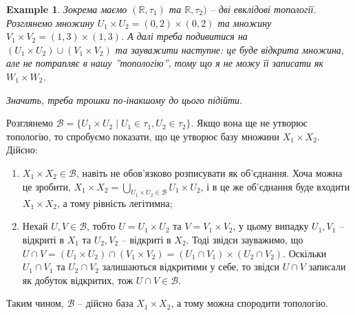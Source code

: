 \documentclass[a4paper, 10pt]{article}
\theoremstyle{theoremdd}
\newtheorem{example}[theorem]{Example}
\begin{document}
\begin{example}
Зокрема маємо $(\mathbb{R},\tau_1)$ та $\mathbb{R},\tau_2)$ -- дві евклідові топології. Розглянемо множину $U_1 \times U_2 = (0,2) \times (0,2)$ та множину $V_1 \times V_2 = (1,3) \times (1,3)$. А далі треба подивитися на $(U_1 \times U_2) \cup (V_1 \times V_2)$ та зауважити наступне: це буде відкрита множина, але не потрапляє в нашу ''топологію'', тому що я не можу її записати як $W_1 \times W_2$.
\begin{figure}[H]
\centering
{}
\qquad
{}
\end{figure}
\noindent
Значить, треба трошки по-інакшому до цього підійти.
\end{example}
\noindent
Розглянемо $\mathcal{B} = \{U_1 \times U_2 \mid U_1 \in \tau_1, U_2 \in \tau_2\}$. Якщо вона ще не утворює топологію, то спробуємо показати, що це утворює базу множини $X_1 \times X_2$. Дійсно:
\begin{enumerate}[nosep,wide=0pt,label={\arabic*)}]
\item $X_1 \times X_2 \in \mathcal{B}$, навіть не обов'язково розписувати як об'єднання. Хоча можна це зробити, $X_1 \times X_2 = \displaystyle\bigcup_{U_1 \times U_2 \in \mathcal{B}} U_1 \times U_2$, і в це же об'єднання буде входити $X_1 \times X_2$, а тому рівність легітимна;
\item Нехай $U,V \in \mathcal{B}$, тобто $U = U_1 \times U_2$ та $V = V_1 \times V_2$, у цьому випадку $U_1,V_1$ -- відкриті в $X_1$ та $U_2,V_2$ -- відкриті в $X_2$. Тоді звідси зауважимо, що $U \cap V = (U_1 \times U_2) \cap (V_1 \times V_2) = (U_1 \cap V_1) \times (U_2 \cap V_2)$. Оскільки $U_1 \cap V_1$ та $U_2 \cap V_2$ залишаються відкритими у себе, то звідси $U \cap V$ записали як добуток відкритих, тож $U \cap V \in \mathcal{B}$.
\end{enumerate}
Таким чином, $\mathcal{B}$ -- дійсно база $X_1 \times X_2$, а тому можна спородити топологію.
\end{document}

